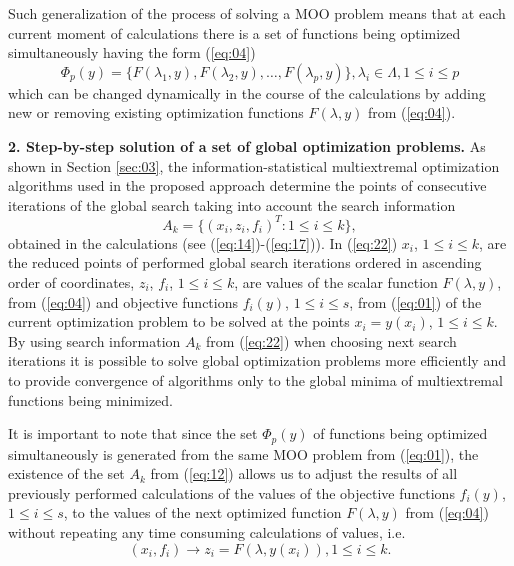 \documentclass[runningheads]{llncs}
\begin{document}
Such generalization of the process of solving a MOO problem means that at each current moment of calculations there is a set of functions being optimized simultaneously having the form (\ref{eq:04})
\begin{equation}
\label{eq:21}
\Phi_p (y)=\{ F(\lambda_1,y), F(\lambda_2,y),\dots,F(\lambda_p,y)  \},  \lambda_i \in \Lambda, 1 \leq i \leq p
\end{equation}
which can be changed dynamically in the course of the calculations by adding new or removing existing optimization functions $F(\lambda, y)$ from (\ref{eq:04}). 


\textbf{2. Step-by-step solution of a set of global optimization problems.} As shown in Section \ref{sec:03}, the information-statistical multiextremal optimization algorithms used in the proposed approach determine the points of consecutive iterations of the global search taking into account the search information
\begin{equation}
\label{eq:22}
A_k=\{(x_i,z_i,f_i )^T:1 \leq i \leq k\},
\end{equation}
obtained in the calculations (see (\ref{eq:14})-(\ref{eq:17})). In (\ref{eq:22}) $x_i$, $1 \leq i \leq k$,  are the reduced points of performed global search iterations ordered in ascending order of coordinates,  $z_i$, $f_i$, $1 \leq i \leq k$, are values of the scalar function $F(\lambda, y)$, from (\ref{eq:04}) and objective functions $f_i(y)$, $1 \leq i \leq s$, from (\ref{eq:01}) of the current optimization problem to be solved at the points $x_i=y(x_i)$, $1 \leq i \leq k$. By using search information $A_k$ from (\ref{eq:22}) when choosing next search iterations it is possible to solve global optimization problems more efficiently and to provide convergence of algorithms only to the global minima of multiextremal functions being minimized.

It is important to note that since the set $\Phi_p(y)$ of functions being optimized  simultaneously is generated from the same MOO problem from (\ref{eq:01}), the existence of the set $A_k$ from (\ref{eq:12}) allows us to adjust the results of all previously performed calculations of the values of the objective functions $f_i(y)$, $1 \leq i \leq s$, to the values of the next optimized function $F(\lambda, y)$ from (\ref{eq:04}) without repeating any time consuming calculations of values, i.e.
\begin{equation}
\label{eq:23}
(x_i,f_i ) \to z_i=F(\lambda, y(x_i)) ,1 \leq i \leq k.
\end{equation}
\end{document}
